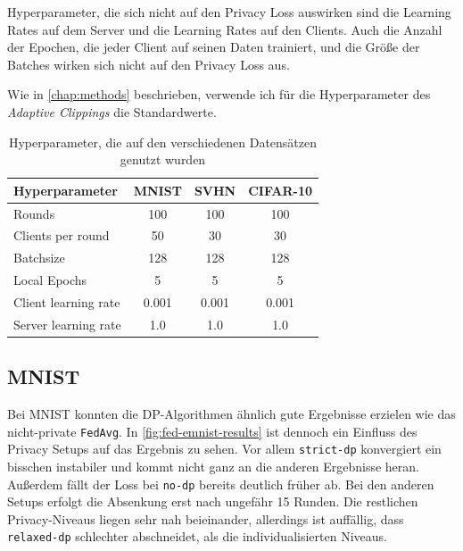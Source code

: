 Hyperparameter, die sich nicht auf den Privacy Loss auswirken sind die Learning Rates auf dem Server und die Learning Rates auf den Clients. Auch die Anzahl der Epochen, die jeder Client auf seinen Daten trainiert, und die Größe der Batches wirken sich nicht auf den Privacy Loss aus.

Wie in \autoref{chap:methods} beschrieben, verwende ich für die Hyperparameter des \textit{Adaptive Clippings} die Standardwerte.

\begin{table}[tb]
	\centering
	\begin{tabular}{lccc}
		\toprule
		Hyperparameter & MNIST & SVHN & CIFAR-10 \\
		\midrule
		Rounds & 100 & 100 & 100 \\
		Clients per round & 50 & 30 & 30 \\
		Batchsize & 128 & 128 & 128 \\
		Local Epochs & 5 & 5 & 5 \\
		Client learning rate & 0.001 & 0.001 & 0.001 \\
		Server learning rate & 1.0 & 1.0 & 1.0 \\
		\bottomrule
	\end{tabular}
	\caption{Hyperparameter, die auf den verschiedenen Datensätzen genutzt wurden}
	\label{tab:fl-hyperparameters}
\end{table}

\subsection{MNIST}

Bei MNIST konnten die DP-Algorithmen ähnlich gute Ergebnisse erzielen wie das nicht-private \texttt{FedAvg}. In \autoref{fig:fed-emnist-results} ist dennoch ein Einfluss des Privacy Setups auf das Ergebnis zu sehen. Vor allem \texttt{strict-dp} konvergiert ein bisschen instabiler und kommt nicht ganz an die anderen Ergebnisse heran. Außerdem fällt der Loss bei \texttt{no-dp} bereits deutlich früher ab. Bei den anderen Setups erfolgt die Absenkung erst nach ungefähr 15 Runden. Die restlichen Privacy-Niveaus liegen sehr nah beieinander, allerdings ist auffällig, dass \texttt{relaxed-dp} schlechter abschneidet, als die individualisierten Niveaus.

